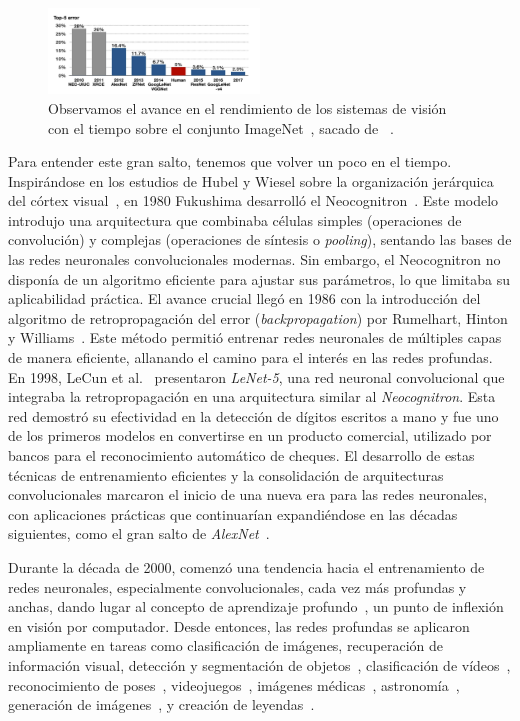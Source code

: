 \documentclass[12pt,letterpaper]{article}
\begin{document}
\begin{figure}
\begin{center}
    \includegraphics[width=0.5\textwidth]{ImageNetProgress.jpg}
\end{center}
\caption{Observamos el avance en el rendimiento de los sistemas de visión con el tiempo sobre el conjunto ImageNet~\cite{ImageNet}, sacado de ~\cite{ImageNetProgress}.}
\label{fig:ImageNetProgress}
\end{figure}


Para entender este gran salto, tenemos que volver un poco en el tiempo.
Inspirándose en los estudios de Hubel y Wiesel sobre la organización jerárquica del córtex visual~\cite{CatVisualCortex}, en 1980 Fukushima desarrolló el Neocognitron~\cite{Neocognitron}. 
Este modelo introdujo una arquitectura que combinaba células simples (operaciones de convolución) y complejas (operaciones de síntesis o \textit{pooling}), 
sentando las bases de las redes neuronales convolucionales modernas. Sin embargo, el Neocognitron no disponía de un algoritmo eficiente para ajustar sus parámetros, lo que limitaba su aplicabilidad práctica.
El avance crucial llegó en 1986 con la introducción del algoritmo de retropropagación del error (\textit{backpropagation}) por Rumelhart, Hinton y Williams~\cite{Backprop}. 
Este método permitió entrenar redes neuronales de múltiples capas de manera eficiente, allanando el camino para el interés en las redes profundas.
En 1998, LeCun et al.~\cite{LeNet} presentaron \textit{LeNet-5}, una red neuronal convolucional que integraba la retropropagación en una arquitectura similar al \textit{Neocognitron}. 
Esta red demostró su efectividad en la detección de dígitos escritos a mano y fue uno de los primeros modelos en convertirse en un producto comercial, 
utilizado por bancos para el reconocimiento automático de cheques. El desarrollo de estas técnicas de entrenamiento eficientes y la consolidación de arquitecturas 
convolucionales marcaron el inicio de una nueva era para las redes neuronales, con aplicaciones prácticas que continuarían expandiéndose en las décadas siguientes, 
como el gran salto de \textit{AlexNet}~\cite{AlexNet}.

Durante la década de 2000, comenzó una tendencia hacia el entrenamiento de redes neuronales, 
especialmente convolucionales, cada vez más profundas y anchas, dando lugar al concepto de aprendizaje profundo~\cite{Hinton2006,Bengio2007,Lee2009,Glorot2010}, un punto de inflexión en visión por computador. 
Desde entonces, las redes profundas se aplicaron ampliamente en tareas como clasificación de imágenes, recuperación de información visual, detección y segmentación de objetos~\cite{Sun2015,Fabaret2012}, clasificación de vídeos~\cite{Simonyan2014}, reconocimiento de poses~\cite{Toshev2014}, videojuegos~\cite{Guo2015}, imágenes médicas~\cite{Levy2016}, astronomía~\cite{Dieleman2014}, generación de imágenes~\cite{Mordvinsev2015, Gatys2016}, 
y creación de leyendas~\cite{Vinyals2015, Karpathy2015}.
\end{document}
